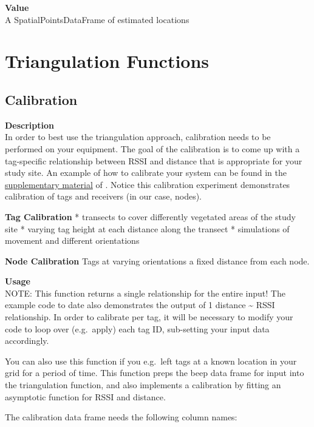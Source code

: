 \documentclass[
]{book}
\begin{document}
\textbf{Value}\\
A SpatialPointsDataFrame of estimated locations

\hypertarget{triangulation-functions}{%
\section{Triangulation Functions}\label{triangulation-functions}}

\hypertarget{calibration}{%
\subsection{Calibration}\label{calibration}}

\textbf{Description}\\
In order to best use the triangulation approach, calibration needs to be performed on your equipment. The goal of the calibration is to come up with a tag-specific relationship between RSSI and distance that is appropriate for your study site. An example of how to calibrate your system can be found in the \href{https://academic.oup.com/beheco/article/31/4/873/5840921?login=true\#supplementary-data}{supplementary material} of \citet{bircher2020extraterritorial}. Notice this calibration experiment demonstrates calibration of tags and receivers (in our case, nodes).

\textbf{Tag Calibration}
* transects to cover differently vegetated areas of the study site
* varying tag height at each distance along the transect
* simulations of movement and different orientations

\textbf{Node Calibration} Tags at varying orientations a fixed distance from each node.

\textbf{Usage}\\
NOTE: This function returns a single relationship for the entire input! The example code to date also demonstrates the output of 1 distance \textasciitilde{} RSSI relationship. In order to calibrate per tag, it will be necessary to modify your code to loop over (e.g.~apply) each tag ID, sub-setting your input data accordingly.

You can also use this function if you e.g.~left tags at a known location in your grid for a period of time. This function preps the beep data frame for input into the triangulation function, and also implements a calibration by fitting an asymptotic function for RSSI and distance.

The calibration data frame needs the following column names:
\end{document}
